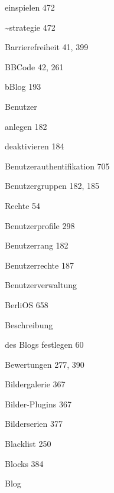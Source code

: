 \documentclass{book}
\renewcommand\subitem{\par}
\begin{document}
\begin{multicols}{2}
\begin{osp-index}
    \subitem einspielen\hspace{1mm} 472
    \subitem \textasciitilde{}strategie\hspace{1mm} 472
  \item Barrierefreiheit\hspace{1mm} 41, 399
  \item BBCode\hspace{1mm} 42, 261
  \item bBlog\hspace{1mm} 193
  \item Benutzer
    \subitem anlegen\hspace{1mm} 182
    \subitem deaktivieren\hspace{1mm} 184
  \item Benutzerauthentifikation\hspace{1mm} 705
  \item Benutzergruppen\hspace{1mm} 182, 185
    \subitem Rechte\hspace{1mm} 54
  \item Benutzerprofile\hspace{1mm} 298
  \item Benutzerrang\hspace{1mm} 182
  \item Benutzerrechte\hspace{1mm} 187
  \item Benutzerverwaltung\hspace{1mm} 
  \item BerliOS\hspace{1mm} 658
  \item Beschreibung
    \subitem des Blogs festlegen\hspace{1mm} 60
  \item Bewertungen\hspace{1mm} 277, 390
  \item Bildergalerie\hspace{1mm} 367
  \item Bilder-Plugins\hspace{1mm} 367
  \item Bilderserien\hspace{1mm} 377
  \item Blacklist\hspace{1mm} 250
  \item Blocks\hspace{1mm} 384
  \item Blog

\end{osp-index}
\end{multicols}
\end{document}
